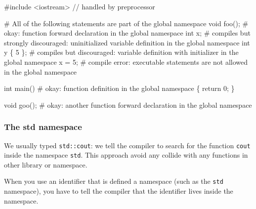 \documentclass[
  letterpaper,
  DIV=11,
  numbers=noendperiod]{scrreprt}
\newenvironment{Shaded}{\begin{snugshade}}{\end{snugshade}}
\newcommand{\CommentTok}[1]{\textcolor[rgb]{0.37,0.37,0.37}{#1}}
\newcommand{\DecValTok}[1]{\textcolor[rgb]{0.68,0.00,0.00}{#1}}
\newcommand{\FunctionTok}[1]{\textcolor[rgb]{0.28,0.35,0.67}{#1}}
\newcommand{\NormalTok}[1]{\textcolor[rgb]{0.00,0.23,0.31}{#1}}
\newcommand{\OtherTok}[1]{\textcolor[rgb]{0.00,0.23,0.31}{#1}}
\begin{document}
\begin{Shaded}
\begin{Highlighting}[]
\CommentTok{\#include \textless{}iostream\textgreater{} // handled by preprocessor}

\CommentTok{\# All of the following statements are part of the global namespace}
\NormalTok{void }\FunctionTok{foo}\NormalTok{();    }\CommentTok{\# okay: function forward declaration in the global namespace}
\NormalTok{int x;         }\CommentTok{\# compiles but strongly discouraged: uninitialized variable definition in the global namespace}
\NormalTok{int y \{ }\DecValTok{5}\NormalTok{ \};   }\CommentTok{\# compiles but discouraged: variable definition with initializer in the global namespace}
\NormalTok{x }\OtherTok{=} \DecValTok{5}\NormalTok{;         }\CommentTok{\# compile error: executable statements are not allowed in the global namespace}

\NormalTok{int }\FunctionTok{main}\NormalTok{()     }\CommentTok{\# okay: function definition in the global namespace}
\NormalTok{\{}
\NormalTok{    return }\DecValTok{0}\NormalTok{;}
\NormalTok{\}}

\NormalTok{void }\FunctionTok{goo}\NormalTok{();    }\CommentTok{\# okay: another function forward declaration in the global namespace}
\end{Highlighting}
\end{Shaded}

\hypertarget{the-std-namespace}{%
\subsubsection{The std namespace}\label{the-std-namespace}}

We usually typed \texttt{std::cout}: we tell the compiler to search for
the function \texttt{cout} inside the namespace \texttt{std}. This
approach avoid any collide with any functions in other library or
namespace.

\begin{tcolorbox}[enhanced jigsaw, toprule=.15mm, rightrule=.15mm, opacityback=0, breakable, leftrule=.75mm, colback=white, colframe=quarto-callout-tip-color-frame, arc=.35mm, left=2mm, bottomrule=.15mm]
\begin{minipage}[t]{5.5mm}
\textcolor{quarto-callout-tip-color}{\faLightbulb}
\end{minipage}%
\begin{minipage}[t]{\textwidth - 5.5mm}

When you use an identifier that is defined a namespace (such as the
\texttt{std} namespace), you have to tell the compiler that the
identifier lives inside the namespace.

\end{minipage}%
\end{tcolorbox}
\end{document}
